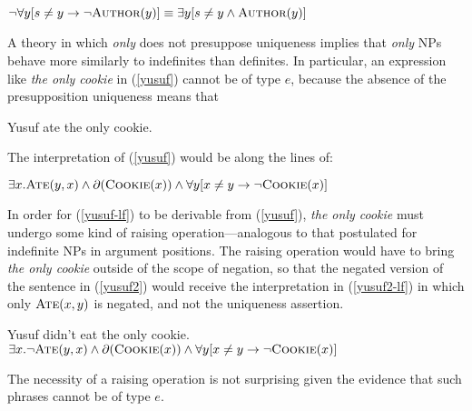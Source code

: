 \begin{exe}
	\ex $\neg \forall y [ s \ne y \to \neg \textsc{Author}(y) ] \equiv \exists y [ s \ne y \land \textsc{Author}(y) ]$
\end{exe}

A theory in which \textit{only} does not presuppose uniqueness implies that \textit{only} NPs behave more similarly to indefinites than definites. In particular, an expression like \textit{the only cookie} in (\ref{yusuf}) cannot be of type $e$, because the absence of the presupposition uniqueness means that

\begin{exe}
	\ex \label{yusuf} Yusuf ate the only cookie.
\end{exe}

The interpretation of (\ref{yusuf}) would be along the lines of:

\begin{exe}
	\ex \label{yusuf-lf} $\exists x . \textsc{Ate}(y, x) \land \partial(\textsc{Cookie}(x)) \land \forall y [ x \ne y \to \neg \textsc{Cookie}(x) ]$
\end{exe}

In order for (\ref{yusuf-lf}) to be derivable from (\ref{yusuf}), \textit{the only cookie} must undergo some kind of raising operation---analogous to that postulated for indefinite NPs in argument positions. The raising operation would have to bring \textit{the only cookie} outside of the scope of negation, so that the negated version of the sentence in (\ref{yusuf2}) would receive the interpretation in (\ref{yusuf2-lf}) in which only $\textsc{Ate}(x, y)$ is negated, and not the uniqueness assertion.

\begin{exe}
	\ex \label{yusuf2} Yusuf didn't eat the only cookie.
	\ex \label{yusuf2-lf} $\exists x . \neg\textsc{Ate}(y, x) \land \partial(\textsc{Cookie}(x)) \land \forall y [ x \ne y \to \neg \textsc{Cookie}(x) ]$
\end{exe}

The necessity of a raising operation is not surprising given the evidence that such phrases cannot be of type $e$.

